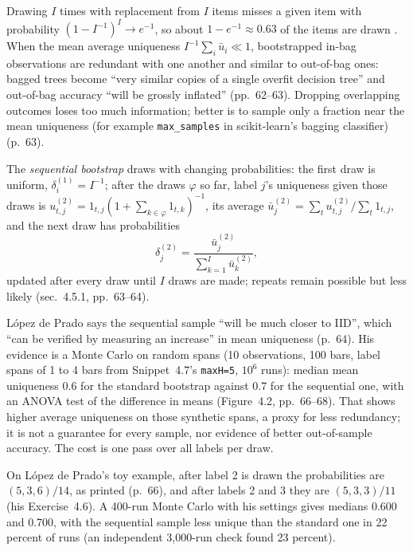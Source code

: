 \begin{qfmethod}\label{meth:sequential-bootstrap}
 Drawing $I$ times with replacement from $I$ items misses a given item with probability $(1-I^{-1})^I\to e^{-1}$, so about $1-e^{-1}\approx0.63$ of the items are drawn \citep[chap.~4, sec.~4.5, p.~62]{alpha-afml}. When the mean average uniqueness $I^{-1}\sum_i\bar u_i\ll1$, bootstrapped in-bag observations are redundant with one another and similar to out-of-bag ones: bagged trees become ``very similar copies of a single overfit decision tree'' and out-of-bag accuracy ``will be grossly inflated'' (pp.~62--63). Dropping overlapping outcomes loses too much information; better is to sample only a fraction near the mean uniqueness (for example \nolinkurl{max_samples} in scikit-learn's bagging classifier) (p.~63).

The \emph{sequential bootstrap} draws with changing probabilities: the first draw is uniform, $\delta_i^{(1)}=I^{-1}$; after the draws $\varphi$ so far, label $j$'s uniqueness given those draws is $u^{(2)}_{t,j}=1_{t,j}(1+\sum_{k\in\varphi}1_{t,k})^{-1}$, its average $\bar u^{(2)}_j=\sum_tu^{(2)}_{t,j}/\sum_t1_{t,j}$, and the next draw has probabilities
\[ \delta^{(2)}_j=\frac{\bar u^{(2)}_j}{\sum_{k=1}^I\bar u^{(2)}_k}, \]
updated after every draw until $I$ draws are made; repeats remain possible but less likely (sec.~4.5.1, pp.~63--64).

 López de Prado says the sequential sample ``will be much closer to IID'', which ``can be verified by measuring an increase'' in mean uniqueness (p.~64). His evidence is a Monte Carlo on random spans (10 observations, 100 bars, label spans of 1 to 4 bars from Snippet~4.7's \texttt{maxH=5}, $10^6$ runs): median mean uniqueness 0.6 for the standard bootstrap against 0.7 for the sequential one, with an ANOVA test of the difference in means (Figure~4.2, pp.~66--68). That shows higher average uniqueness on those synthetic spans, a proxy for less redundancy; it is not a guarantee for every sample, nor evidence of better out-of-sample accuracy. The cost is one pass over all labels per draw.

 On López de Prado's toy example, after label 2 is drawn the probabilities are $(5,3,6)/14$, as printed (p.~66), and after labels 2 and 3 they are $(5,3,3)/11$ (his Exercise~4.6). A 400-run Monte Carlo with his settings gives medians 0.600 and 0.700, with the sequential sample less unique than the standard one in 22 percent of runs (an independent 3,000-run check found 23 percent).


\end{qfmethod}
